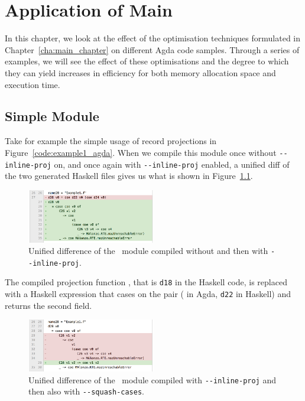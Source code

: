 \chapter{Application of Main}
\label{cha:application_of_main}

In this chapter, we look at the effect of the optimisation techniques formulated in Chapter~\ref{cha:main_chapter} on different Agda code samples. Through a series of examples, we will see the effect of these optimisations and the degree to which they can yield increases in efficiency for both memory allocation space and execution time.


\section{Simple Module}



Take for example the simple usage of record projections in Figure~\ref{code:example1_agda}. When we compile this module once without \texttt{-{}-inline-proj} on, and once again with \texttt{-{}-inline-proj} enabled, a unified diff of the two generated Haskell files gives us what is shown in Figure~\ref{fig:Example1_inline}.

\begin{figure}[h]
    \centering
    \includegraphics[width=0.5\textwidth]{Figures/Example1_inline}
    \caption{Unified difference of the ~module compiled without and then with \texttt{-{}-inline-proj}.}
    \label{fig:Example1_inline}
\end{figure}

The compiled projection function , that is \lstinline{d18} in the Haskell code, is replaced with a Haskell expression that cases on the pair ( in Agda, \lstinline{d22} in Haskell) and returns the second field.

\begin{figure}[h]
    \centering
    \includegraphics[width=0.5\textwidth]{Figures/Example1_squash}
    \caption{Unified difference of the ~module compiled  with \texttt{-{}-inline-proj} and then also with \texttt{-{}-squash-cases}.}
    \label{fig:Example1_squash}
\end{figure}

